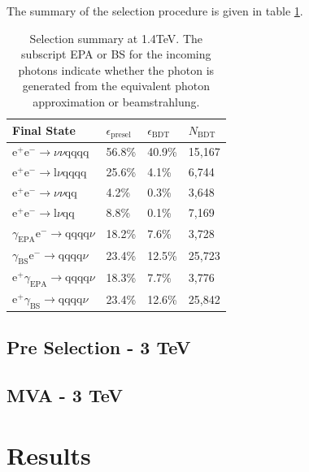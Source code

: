 The summary of the selection procedure is given in table \ref{table:selectionsummary1400GeV}.

\begin{table}[h!]
\centering
\begin{tabular}{ l l l l}
\hline
Final State & $\epsilon_{\text{presel}}$ & $\epsilon_{\text{BDT}}$ & $N_{\text{BDT}}$ \\ 
\hline
$\text{e}^{+}\text{e}^{-} \rightarrow \nu{\nu}\text{qqqq}$ & 56.8\% & 40.9\% & 15,167 \\
$\text{e}^{+}\text{e}^{-} \rightarrow \text{l}\nu\text{qqqq}$ & 25.6\% & 4.1\% & 6,744 \\
$\text{e}^{+}\text{e}^{-} \rightarrow \nu{\nu}\text{qq}$ & 4.2\% & 0.3\% & 3,648 \\
$\text{e}^{+}\text{e}^{-} \rightarrow \text{l}\nu\text{qq}$ & 8.8\% & 0.1\% & 7,169 \\
$\gamma_{\text{EPA}}\text{e}^{-} \rightarrow \text{qqqq}\nu$ & 18.2\% & 7.6\% & 3,728 \\
$\gamma_{\text{BS}}\text{e}^{-} \rightarrow \text{qqqq}\nu$ & 23.4\% & 12.5\% & 25,723 \\
$\text{e}^{+}\gamma_{\text{EPA}} \rightarrow \text{qqqq}\nu$ & 18.3\% & 7.7\% & 3,776 \\
$\text{e}^{+}\gamma_{\text{BS}} \rightarrow \text{qqqq}\nu$ & 23.4\% & 12.6\% & 25,842 \\
\hline
\end{tabular}
\caption[Selection summary at 1.4TeV.]{Selection summary at 1.4TeV.   The subscript EPA or BS for the incoming photons indicate whether the photon is generated from the equivalent photon approximation or beamstrahlung.}
\label{table:selectionsummary1400GeV}
\end{table}

\subsection{Pre Selection - 3 TeV}
\subsection{MVA - 3 TeV}

\section{Results}

